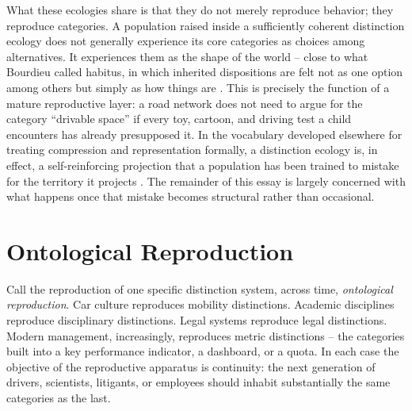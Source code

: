 \documentclass[11pt]{article}
\theoremstyle{plain}
\begin{document}
What these ecologies share is that they do not merely reproduce behavior; they reproduce categories. A population raised inside a sufficiently coherent distinction ecology does not generally experience its core categories as choices among alternatives. It experiences them as the shape of the world -- close to what Bourdieu called habitus, in which inherited dispositions are felt not as one option among others but simply as how things are \cite{bourdieu1977}. This is precisely the function of a mature reproductive layer: a road network does not need to argue for the category ``drivable space'' if every toy, cartoon, and driving test a child encounters has already presupposed it. In the vocabulary developed elsewhere for treating compression and representation formally, a distinction ecology is, in effect, a self-reinforcing projection that a population has been trained to mistake for the territory it projects \cite{flyxion2026cone}. The remainder of this essay is largely concerned with what happens once that mistake becomes structural rather than occasional.

\section{Ontological Reproduction}
\label{sec:ontological-reproduction}

Call the reproduction of one specific distinction system, across time, \emph{ontological reproduction}. Car culture reproduces mobility distinctions. Academic disciplines reproduce disciplinary distinctions. Legal systems reproduce legal distinctions. Modern management, increasingly, reproduces metric distinctions -- the categories built into a key performance indicator, a dashboard, or a quota. In each case the objective of the reproductive apparatus is continuity: the next generation of drivers, scientists, litigants, or employees should inhabit substantially the same categories as the last.
\end{document}
